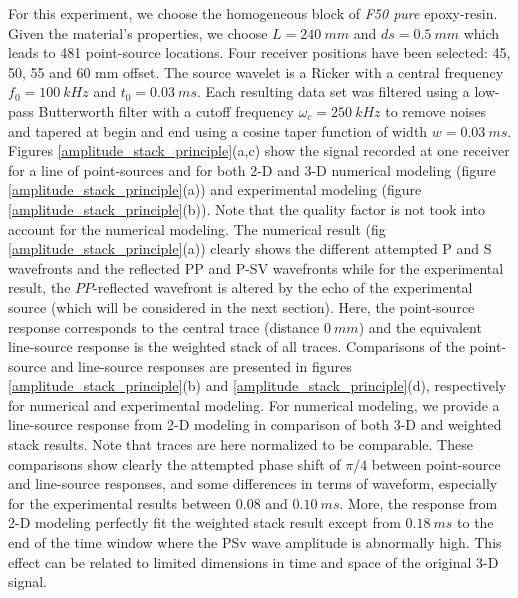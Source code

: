 \documentclass[manuscript,revised]{geophysics}
\newcommand{\twod}{2-D }
\newcommand{\thrd}{3-D }
\begin{document}
\noindent For this experiment, we choose the homogeneous block of \textit{F50 pure} epoxy-resin. Given the material's properties, we choose $L=240\ mm$ and $ds=0.5\ mm$ which leads to 481 point-source locations. Four receiver positions have been selected: 45, 50, 55 and 60 mm offset. The source wavelet is a Ricker with a central frequency $f_{0}=100\ kHz$ and $t_{0}=0.03\ ms$. Each resulting data set was filtered using a low-pass Butterworth filter with a cutoff frequency $\omega_{c}=250\ kHz$ to remove noises and tapered at begin and end using a cosine taper function of width $w=0.03\ ms$. Figures \ref{amplitude_stack_principle}(a,c) show the signal recorded at one receiver for a line of point-sources and for both \twod and \thrd numerical modeling (figure \ref{amplitude_stack_principle}(a)) and experimental modeling (figure \ref{amplitude_stack_principle}(b)). Note that the quality factor is not took into account for the numerical modeling. The numerical result (fig \ref{amplitude_stack_principle}(a)) clearly shows the different attempted P and S wavefronts and the reflected PP and P-SV wavefronts while for the experimental result, the $PP$-reflected wavefront is altered by the echo of the experimental source (which will be considered in the next section). Here, the point-source response corresponds to the central trace (distance $0\ mm$) and the equivalent line-source response is the weighted stack of all traces. Comparisons of the point-source and line-source responses are presented in figures \ref{amplitude_stack_principle}(b) and \ref{amplitude_stack_principle}(d), respectively for numerical and experimental modeling. For numerical modeling, we provide a line-source response from \twod modeling in comparison of both \thrd and weighted stack results. Note that traces are here normalized to be comparable. These comparisons show clearly the attempted phase shift of $\pi/4$ between point-source and line-source responses, and some differences in terms of waveform, especially for the experimental results between $0.08$ and $0.10\ ms$. More, the response from \twod modeling perfectly fit the weighted stack result except from $0.18\ ms$ to the end of the time window where the PSv wave amplitude is abnormally high. This effect can be related to limited dimensions in time and space of the original \thrd signal.
\end{document}
